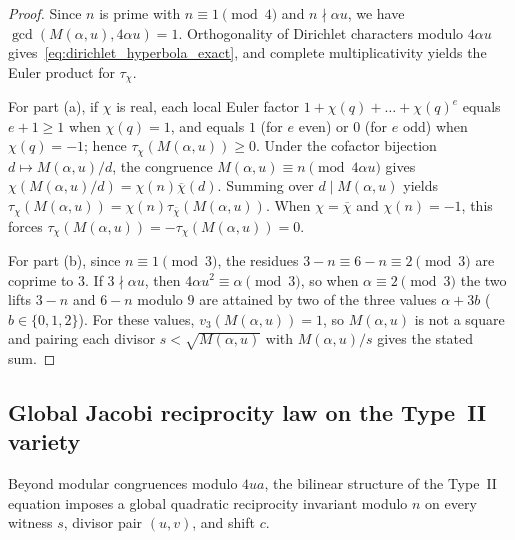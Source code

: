 \documentclass[11pt, a4paper]{article}
\theoremstyle{plain}
\theoremstyle{definition}
\begin{document}
\begin{proof}
Since $n$ is prime with $n\equiv1\pmod 4$ and $n\nmid\alpha u$, we have $\gcd(M(\alpha,u),4\alpha u)=1$. Orthogonality of Dirichlet characters modulo $4\alpha u$ gives~\eqref{eq:dirichlet_hyperbola_exact}, and complete multiplicativity yields the Euler product for $\tau_\chi$.

For part (a), if $\chi$ is real, each local Euler factor $1+\chi(q)+\dots+\chi(q)^{e}$ equals $e+1\ge1$ when $\chi(q)=1$, and equals $1$ (for $e$ even) or $0$ (for $e$ odd) when $\chi(q)=-1$; hence $\tau_\chi(M(\alpha,u))\ge0$. Under the cofactor bijection $d\mapsto M(\alpha,u)/d$, the congruence $M(\alpha,u)\equiv n\pmod{4\alpha u}$ gives $\chi(M(\alpha,u)/d)=\chi(n)\overline{\chi}(d)$. Summing over $d\mid M(\alpha,u)$ yields $\tau_\chi(M(\alpha,u))=\chi(n)\tau_{\overline{\chi}}(M(\alpha,u))$. When $\chi=\overline{\chi}$ and $\chi(n)=-1$, this forces $\tau_\chi(M(\alpha,u))=-\tau_\chi(M(\alpha,u))=0$.

For part (b), since $n\equiv1\pmod 3$, the residues $3-n\equiv 6-n\equiv 2\pmod 3$ are coprime to $3$. If $3\nmid\alpha u$, then $4\alpha u^{2}\equiv\alpha\pmod 3$, so when $\alpha\equiv2\pmod 3$ the two lifts $3-n$ and $6-n$ modulo $9$ are attained by two of the three values $\alpha+3b$ ($b\in\{0,1,2\}$). For these values, $v_3(M(\alpha,u))=1$, so $M(\alpha,u)$ is not a square and pairing each divisor $s<\sqrt{M(\alpha,u)}$ with $M(\alpha,u)/s$ gives the stated sum.
\end{proof}

\subsection{Global Jacobi reciprocity law on the Type~II variety}\label{subsec:jacobi_reciprocity}

Beyond modular congruences modulo $4ua$, the bilinear structure of the Type~II equation imposes a global quadratic reciprocity invariant modulo $n$ on every witness $s$, divisor pair $(u,v)$, and shift $c$.
\end{document}
